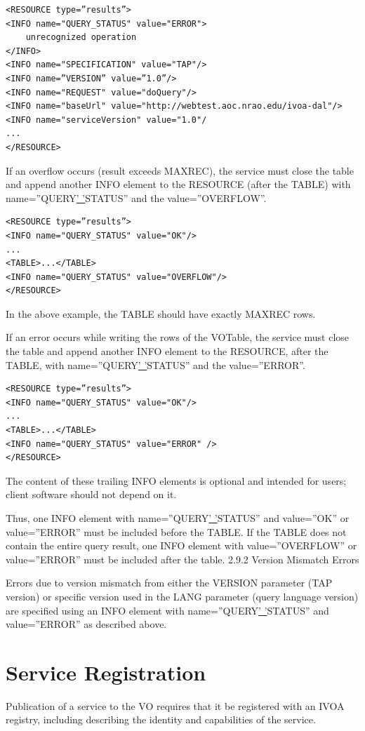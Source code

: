 \documentclass[11pt,a4paper]{ivoa}
\begin{document}
\begin{verbatim}
<RESOURCE type=”results”>
<INFO name="QUERY_STATUS" value="ERROR">
    unrecognized operation
</INFO>
<INFO name="SPECIFICATION" value="TAP"/>
<INFO name=”VERSION” value=”1.0”/>
<INFO name="REQUEST" value="doQuery"/>
<INFO name="baseUrl" value="http://webtest.aoc.nrao.edu/ivoa-dal"/>
<INFO name="serviceVersion" value="1.0"/
...
</RESOURCE>
\end{verbatim}

If an overflow occurs (result exceeds MAXREC), the service must close the table 
and append another INFO element to the RESOURCE (after the TABLE) with 
name=”QUERY\underline{' '}STATUS” and the value=”OVERFLOW”.
\begin{verbatim}
<RESOURCE type=”results”>
<INFO name="QUERY_STATUS" value="OK"/>
...
<TABLE>...</TABLE>
<INFO name="QUERY_STATUS" value="OVERFLOW"/>
</RESOURCE>
\end{verbatim}

In the above example, the TABLE should have exactly MAXREC rows.

If an error occurs while writing the rows of the VOTable, the service must close 
the table and append another INFO element to the RESOURCE, after the TABLE, with 
name=”QUERY\underline{' '}STATUS” and the value=”ERROR”.
\begin{verbatim}
<RESOURCE type=”results”>
<INFO name="QUERY_STATUS" value="OK"/>
...
<TABLE>...</TABLE>
<INFO name="QUERY_STATUS" value="ERROR" />
</RESOURCE>
\end{verbatim}
The content of these trailing INFO elements is optional and intended for users; 
client software should not depend on it.

Thus, one INFO element with name=”QUERY\underline{' '}STATUS” and value=”OK” or 
value=”ERROR” must be included before the TABLE. If the TABLE does not contain 
the entire query result, one INFO element with value=”OVERFLOW” or value=”ERROR” 
 must be included after the table.
2.9.2 Version Mismatch Errors

Errors due to version mismatch from either the VERSION parameter (TAP version) 
or specific version used in the LANG parameter (query language version) are 
specified using an INFO element with name=”QUERY\underline{' '}STATUS” and 
value=”ERROR” as described above.  

\section{Service Registration}
Publication of a service to the VO requires that it be registered with an IVOA 
registry, including describing the identity and capabilities of the service.
\end{document}
